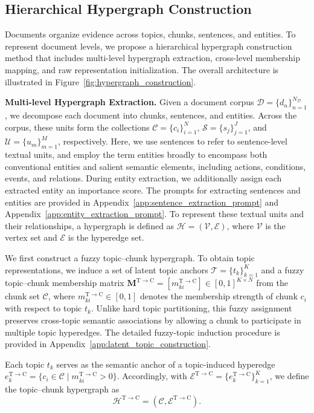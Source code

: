 \documentclass{article} %
\begin{document}
\subsection{Hierarchical Hypergraph Construction}
\label{sec:hierarchical_hypergraph}

Documents organize evidence across topics, chunks, sentences, and entities. To represent document levels, we propose a hierarchical hypergraph construction method that includes multi-level hypergraph extraction, cross-level membership mapping, and raw representation initialization. The overall architecture is illustrated in Figure~\ref{fig:hypergraph_construction}.

\smallskip
\noindent\textbf{Multi-level Hypergraph Extraction.}
Given a document corpus $\mathcal{D}=\{d_n\}_{n=1}^{N_{\mathcal{D}}}$, we decompose each document into chunks, sentences, and entities. Across the corpus, these units form the collections $\mathcal{C}=\{c_i\}_{i=1}^{N}$, $\mathcal{S}=\{s_j\}_{j=1}^{J}$, and $\mathcal{U}=\{u_m\}_{m=1}^{M}$, respectively. Here, we use sentences to refer to sentence-level textual units, and employ the term entities broadly to encompass both conventional entities and salient semantic elements, including actions, conditions, events, and relations. During entity extraction, we additionally assign each extracted entity an importance score.  The prompts for extracting sentences and entities are provided in Appendix~\ref{app:sentence_extraction_prompt} and Appendix~\ref{app:entity_extraction_prompt}. To represent these textual units and their relationships, a hypergraph is defined as $\mathcal{H}=(\mathcal{V},\mathcal{E})$, where $\mathcal{V}$ is the vertex set and $\mathcal{E}$ is the hyperedge set.

We first construct a fuzzy topic--chunk hypergraph. To obtain topic representations, we induce a set of latent topic anchors $\mathcal{T}=\{t_k\}_{k=1}^{K}$ and a fuzzy topic--chunk membership matrix $\mathbf{M}^{\mathrm{T}\to\mathrm{C}}=[m_{ki}^{\mathrm{T}\to\mathrm{C}}]\in[0,1]^{K\times N}$ from the chunk set $\mathcal{C}$, where $m_{ki}^{\mathrm{T}\to\mathrm{C}}\in[0,1]$ denotes the membership strength of chunk $c_i$ with respect to topic $t_k$. Unlike hard topic partitioning, this fuzzy assignment preserves cross-topic semantic associations by allowing a chunk to participate in multiple topic hyperedges. The detailed fuzzy-topic induction procedure is provided in Appendix~\ref{app:latent_topic_construction}.

Each topic $t_k$ serves as the semantic anchor of a topic-induced hyperedge
$e_k^{\mathrm{T}\to\mathrm{C}}=\{c_i\in\mathcal{C}\mid m_{ki}^{\mathrm{T}\to\mathrm{C}}>0\}$.
Accordingly, with
$\mathcal{E}^{\mathrm{T}\to\mathrm{C}}
=
\{e_k^{\mathrm{T}\to\mathrm{C}}\}_{k=1}^{K}$,
we define the topic--chunk hypergraph as
\begin{equation}
\mathcal{H}^{\mathrm{T}\to\mathrm{C}}
=
\left(
\mathcal{C},
\mathcal{E}^{\mathrm{T}\to\mathrm{C}}
\right).
\end{equation}
\end{document}
